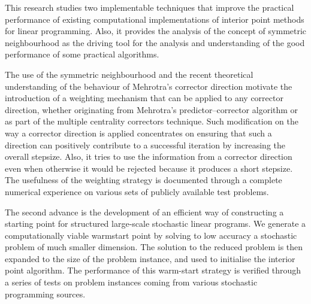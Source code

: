 
%
%

This research studies two implementable techniques that improve
the practical performance of existing computational implementations 
of interior point methods for linear programming.
Also, it provides the analysis of the concept of symmetric neighbourhood 
as the driving tool for the analysis and understanding of the good 
performance of some practical algorithms. 

The use of the symmetric neighbourhood and the recent
theoretical understanding of the behaviour of Mehrotra's
corrector direction motivate the introduction of a weighting
mechanism that can be applied to any corrector direction,
whether originating from Mehrotra's predictor--corrector algorithm
or as part of the multiple centrality correctors technique.
Such modification on the way a corrector direction is applied
concentrates on ensuring that such a direction can positively
contribute to a successful iteration by increasing the overall
stepsize. Also, it tries to use the information from a corrector
direction even when otherwise it would be rejected because it
produces a short stepsize. 
The usefulness of the weighting strategy is documented through
a complete numerical experience on various sets of publicly
available test problems.

The second advance is the development of an efficient way of 
constructing a starting point for structured large-scale 
stochastic linear programs.
We generate a computationally viable warmstart point by solving 
to low accuracy a stochastic problem of much smaller dimension.
The solution to the reduced problem is then expanded to the
size of the problem instance, and used to initialise the
interior point algorithm.
The performance of this warm-start strategy is verified through 
a series of tests on problem instances coming from various stochastic
programming sources.
